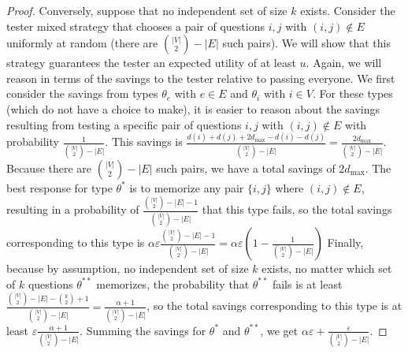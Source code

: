 \documentclass{article}
\begin{document}
\begin{proof}
Conversely, suppose that no independent set of size $k$ exists.  Consider
the tester mixed strategy that chooses a pair of questions $i,j$ with
$(i,j) \notin E$ uniformly at random (there are ${|V| \choose 2} - |E|$
such pairs).  We will show that this strategy guarantees the tester an
expected utility of at least $u$.  Again, we will reason in terms of the
savings to the tester relative to passing everyone.  We first consider the
savings from types $\theta_e$ with $e \in E$ and $\theta_i$ with $i \in V$.
For these types (which do not have a choice to make), it is easier to
reason about the savings resulting from testing a specific pair of
questions $i,j$ with $(i,j) \notin E$ with probability $\frac{1}{{|V|
    \choose 2} - |E|}$.  This savings is $\frac{d(i)+d(j)+2d_{\text{max}} -
  d(i) - d(j)}{{|V| \choose 2} - |E|} = \frac{2d_{\text{max}}}{{|V| \choose
    2} - |E|}$.  Because there are ${|V| \choose 2} - |E|$
such pairs, we have a total savings of $2d_{\text{max}}$.
The best response for type $\theta^*$ is to memorize any pair $\{i,j\}$
where $(i,j) \notin E$, 
resulting in a probability of $\frac{{|V| \choose 2} - |E| - 1}
{{|V| \choose 2} - |E|}$ that this type fails, so the total savings
corresponding to this type is $\alpha \varepsilon 
\frac{{|V| \choose 2} - |E| - 1}
{{|V| \choose 2} - |E|} = \alpha \varepsilon (1-\frac{1}{{|V| \choose 2} - |E|})$
Finally, because by assumption, no independent set of size $k$ exists, no
matter which set of $k$ questions $\theta^{**}$ memorizes, the probability
that $\theta^{**}$ fails is at least $\frac{{|V| \choose 2} - |E| - {k
    \choose 2} +1}{{|V| \choose 2} - |E|} = \frac{\alpha+1}{{|V| \choose 2}
  - |E|}$, so the total savings corresponding to this type is at least
$\varepsilon \frac{\alpha+1}{{|V| \choose 2} - |E|}$.  Summing the savings
for $\theta^*$ and $\theta^{**}$, we get $\alpha \varepsilon +
\frac{\varepsilon}{{|V| \choose 2} - |E|}$.

\end{proof}
\end{document}
